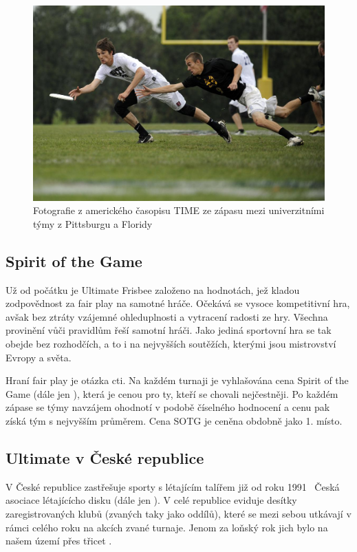 \begin{figure}[ht!]
  \centering
  \includegraphics[width=130mm]{./images/ultimate-frisbee.jpg}
  \caption{Fotografie z amerického časopisu TIME ze zápasu mezi
    univerzitními týmy z Pittsburgu a Floridy~\cite{ultimate_time}\label{overflow}
    }
\end{figure}

\subsection{Spirit of the Game}

  Už od počátku je Ultimate Frisbee založeno na hodnotách, jež kladou zodpovědnost za fair play na samotné hráče.
  Očekává se vysoce kompetitivní hra, avšak bez ztráty vzájemné ohleduplnosti a vytracení radosti ze hry.
  Všechna provinění vůči pravidlům řeší samotní hráči. Jako jediná sportovní hra se tak obejde bez rozhodčích, a to i
  na nejvyšších soutěžích, kterými jsou mistrovství Evropy a světa.

  Hraní fair play je otázka cti. Na každém turnaji je vyhlašována cena Spirit of the Game (dále jen ),
  která je cenou pro ty, kteří se chovali nejčestněji. Po každém zápase se týmy navzájem ohodnotí
  v podobě číselného hodnocení a cenu pak získá tým s nejvyšším průměrem. Cena SOTG
  je ceněna obdobně jako 1. místo.

\subsection{Ultimate v České republice}

  V České republice zastřešuje sporty s létajícím talířem již od roku 1991~\cite{cald_historie} Česká asociace
  lé\-ta\-jícícho disku (dále jen ). V celé republice eviduje desítky zaregistrovaných
  klubů (zvaných taky jako oddílů), které se mezi sebou utkávají v rámci celého roku na akcích zvané turnaje.
  Jenom za loňský rok jich bylo na našem území přes třicet \cite{cald_kalendar}.

